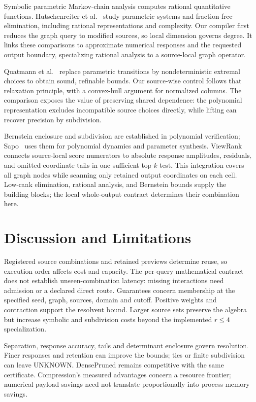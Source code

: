 \documentclass[conference]{IEEEtran}
\newcommand{\unknown}{\textsf{UNKNOWN}}
\begin{document}
Symbolic parametric Markov-chain analysis computes rational quantitative functions. Hutschenreiter et al.~\cite{parametric} study parametric systems and fraction-free elimination, including rational representations and complexity. Our compiler first reduces the graph query to modified sources, so local dimension governs degree. It links these comparisons to approximate numerical responses and the requested output boundary, specializing rational analysis to a source-local graph operator.

Quatmann et al.~\cite{lifting} replace parametric transitions by nondeterministic extremal choices to obtain sound, refinable bounds. Our source-wise control follows that relaxation principle, with a convex-hull argument for normalized columns. The comparison exposes the value of preserving shared dependence: the polynomial representation excludes incompatible source choices directly, while lifting can recover precision by subdivision.

Bernstein enclosure and subdivision are established in polynomial verification; Sapo~\cite{sapo} uses them for polynomial dynamics and parameter synthesis. ViewRank connects source-local score numerators to absolute response amplitudes, residuals, and omitted-coordinate tails in one sufficient top-$k$ test. This integration covers all graph nodes while scanning only retained output coordinates on each cell. Low-rank elimination, rational analysis, and Bernstein bounds supply the building blocks; the local whole-output contract determines their combination here.

\section{Discussion and Limitations}
Registered source combinations and retained previews determine reuse, so execution order affects cost and capacity. The per-query mathematical contract does not establish unseen-combination latency: missing interactions need admission or a declared direct route. Guarantees concern membership at the specified seed, graph, sources, domain and cutoff. Positive weights and contraction support the resolvent bound. Larger source sets preserve the algebra but increase symbolic and subdivision costs beyond the implemented $r\leq4$ specialization.

Separation, response accuracy, tails and determinant enclosure govern resolution. Finer responses and retention can improve the bounds; ties or finite subdivision can leave \unknown. DensePruned remains competitive with the same certificate. Compression's measured advantages concern a resource frontier; numerical payload savings need not translate proportionally into process-memory savings.
\end{document}
